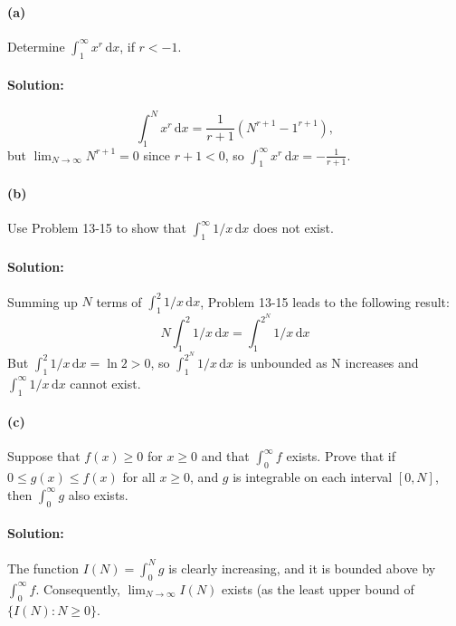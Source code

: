 \documentclass{article}
\begin{document}
\paragraph{(a)} Determine $\int_1^{\infty} x^r \,\mathrm{d}x$, if $r < -1$.

\paragraph{Solution:} \begin{equation*}
  \int_1^N x^r \,\mathrm{d}x = \frac{1}{r + 1}(N^{r + 1} - 1^{r + 1}),
\end{equation*} but $\lim_{N \rightarrow \infty} N^{r + 1} = 0$ since $r + 1 <
0$, so $\int_1^{\infty} x^r \,\mathrm{d}x = -\frac{1}{r + 1}$.

\paragraph{(b)} Use Problem 13-15 to show that $\int_1^{\infty} 1/x
\,\mathrm{d}x$ does not exist.

\paragraph{Solution:} Summing up $N$ terms of $\int_1^2 1/x \,\mathrm{d}x$,
Problem 13-15 leads to the following result: \begin{equation*}
  N\int_1^2 1/x \,\mathrm{d}x = \int_1^{2^N} 1/x \,\mathrm{d}x
\end{equation*} But $\int_1^2 1/x \,\mathrm{d}x = \ln 2 > 0$, so $\int_1^{2^N}
1/x \,\mathrm{d}x$ is unbounded as N increases and $\int_1^{\infty} 1/x
\,\mathrm{d}x$ cannot exist.

\paragraph{(c)} Suppose that $f(x) \geq 0$ for $x \geq 0$ and that
$\int_0^{\infty} f$ exists. Prove that if $0 \leq g(x) \leq f(x)$ for all $x
\geq 0$, and $g$ is integrable on each interval $[0, N]$, then $\int_0^{\infty}
g$ also exists.

\paragraph{Solution:} The function $I(N) = \int_0^N g$ is clearly increasing,
and it is bounded above by $\int_0^{\infty} f$. Consequently,
$\lim_{N \rightarrow \infty} I(N)$ exists (as the least upper bound of $\{I(N):
N \geq 0\}$.
\end{document}
